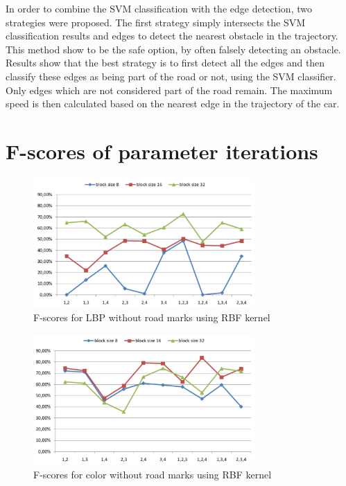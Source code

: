 \documentclass[runningheads,a4paper]{llncs}
\begin{document}
In order to combine the SVM classification with the edge detection, two strategies were proposed. The first strategy simply intersects the SVM classification results and edges to detect the nearest obstacle in the trajectory. This method show to be the safe option, by often falsely detecting an obstacle.  Results show that the best strategy is to first detect all the edges and then classify these edges as being part of the road or not, using the SVM classifier. Only edges which are not considered part of the road remain. The maximum speed is then calculated based on the nearest edge in the trajectory of the car.

\newpage
{}


\newpage
\appendix
\section{F-scores of parameter iterations}
\label{appendix}

\begin{figure}
\centering
\includegraphics[width=0.75\textwidth]{fig/RBF-LBP-wo-RM.pdf}
\caption{F-scores for LBP without road marks using RBF kernel}
\end{figure}

\begin{figure}
\centering
\includegraphics[width=0.75\textwidth]{fig/RBF-COL-wo-RM.pdf}
\caption{F-scores for color without road marks using RBF kernel}
\end{figure}
\end{document}
